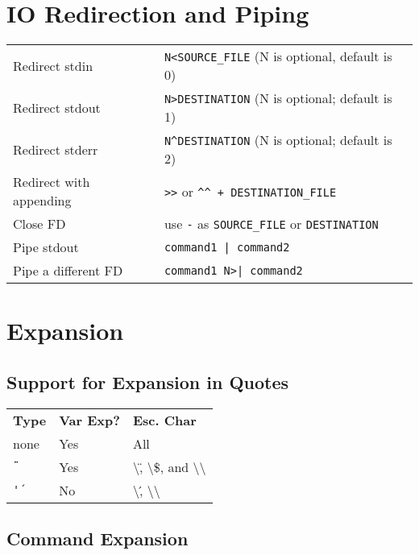 \documentclass[10pt]{extarticle}
\begin{document}
\begin{paracol}{2}
\section*{IO Redirection and Piping}

\begin{tabularx}{\columnwidth}{X X}

    Redirect stdin & \texttt{N<SOURCE\_FILE} (N is optional, default is 0) \\
    Redirect stdout & \texttt{N>DESTINATION} (N is optional; default is 1) \\
    Redirect stderr & \texttt{N\^{}DESTINATION} (N is optional; default is 2) \\
    Redirect with appending & \texttt{>>} or \texttt{\^{}\^{} + DESTINATION\_FILE} \\
    Close FD & use \texttt{-} as \texttt{SOURCE\_FILE} or \texttt{DESTINATION} \\
    Pipe stdout & \texttt{command1 | command2} \\
    Pipe a different FD & \texttt{command1 N>| command2} \\

\end{tabularx}

\section*{Expansion}

\subsection*{Support for Expansion in Quotes}

\begin{tabularx}{\columnwidth}{X X X}
    \rowcolor{DarkBackground}
    \textbf{Type} & \textbf{Var Exp?} & \textbf{Esc. Char} \\
    none & Yes & All \\
    \texttt{\" \"} & Yes & \textbackslash\", \textbackslash\$, and \textbackslash\textbackslash{} \\
    \texttt{\' \'} & No & \textbackslash\', \textbackslash\textbackslash{}
\end{tabularx}

\subsection*{Command Expansion}


\end{paracol}
\end{document}
